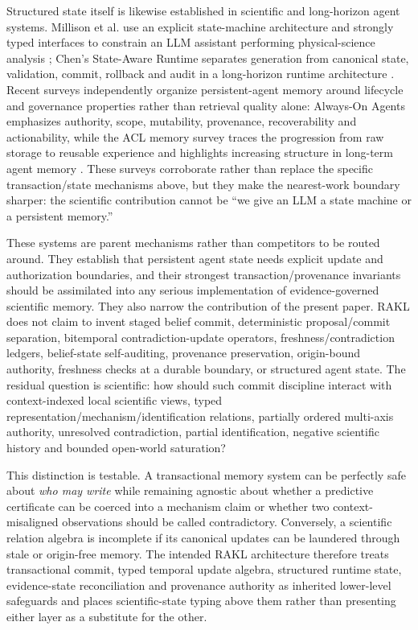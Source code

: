 Structured state itself is likewise established in scientific and long-horizon agent systems. Millison et al. use an explicit state-machine architecture and strongly typed interfaces to constrain an LLM assistant performing physical-science analysis \cite{millison2026}; Chen's State-Aware Runtime separates generation from canonical state, validation, commit, rollback and audit in a long-horizon runtime architecture \cite{chen2026stateaware}. Recent surveys independently organize persistent-agent memory around lifecycle and governance properties rather than retrieval quality alone: Always-On Agents emphasizes authority, scope, mutability, provenance, recoverability and actionability, while the ACL memory survey traces the progression from raw storage to reusable experience and highlights increasing structure in long-term agent memory \cite{ding2026alwayson,luo2026memorysurvey}. These surveys corroborate rather than replace the specific transaction/state mechanisms above, but they make the nearest-work boundary sharper: the scientific contribution cannot be ``we give an LLM a state machine or a persistent memory.''

These systems are parent mechanisms rather than competitors to be routed around. They establish that persistent agent state needs explicit update and authorization boundaries, and their strongest transaction/provenance invariants should be assimilated into any serious implementation of evidence-governed scientific memory. They also narrow the contribution of the present paper. RAKL does not claim to invent staged belief commit, deterministic proposal/commit separation, bitemporal contradiction-update operators, freshness/contradiction ledgers, belief-state self-auditing, provenance preservation, origin-bound authority, freshness checks at a durable boundary, or structured agent state. The residual question is scientific: how should such commit discipline interact with context-indexed local scientific views, typed representation/mechanism/identification relations, partially ordered multi-axis authority, unresolved contradiction, partial identification, negative scientific history and bounded open-world saturation?

This distinction is testable. A transactional memory system can be perfectly safe about \emph{who may write} while remaining agnostic about whether a predictive certificate can be coerced into a mechanism claim or whether two context-misaligned observations should be called contradictory. Conversely, a scientific relation algebra is incomplete if its canonical updates can be laundered through stale or origin-free memory. The intended RAKL architecture therefore treats transactional commit, typed temporal update algebra, structured runtime state, evidence-state reconciliation and provenance authority as inherited lower-level safeguards and places scientific-state typing above them rather than presenting either layer as a substitute for the other.
